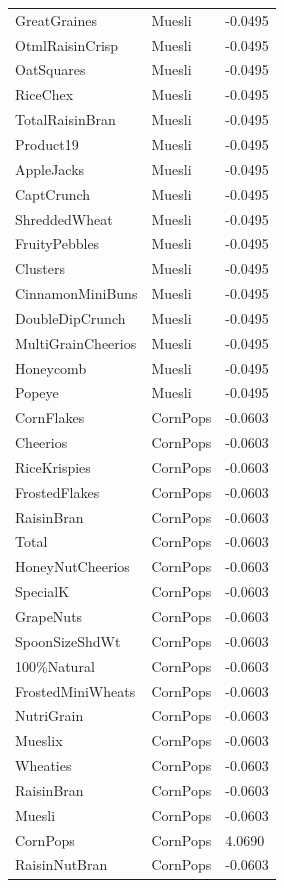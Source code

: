 \begin{table}[!htbp]
\begin{tabular}{lll}
GreatGraines & Muesli & -0.0495
\\
OtmlRaisinCrisp & Muesli & -0.0495
\\
OatSquares & Muesli & -0.0495
\\
RiceChex & Muesli & -0.0495
\\
TotalRaisinBran & Muesli & -0.0495
\\
Product19 & Muesli & -0.0495
\\
AppleJacks & Muesli & -0.0495
\\
CaptCrunch & Muesli & -0.0495
\\
ShreddedWheat & Muesli & -0.0495
\\
FruityPebbles & Muesli & -0.0495
\\
Clusters & Muesli & -0.0495
\\
CinnamonMiniBuns & Muesli & -0.0495
\\
DoubleDipCrunch & Muesli & -0.0495
\\
MultiGrainCheerios & Muesli & -0.0495
\\
Honeycomb & Muesli & -0.0495
\\
Popeye & Muesli & -0.0495
\\
CornFlakes & CornPops & -0.0603
\\
Cheerios & CornPops & -0.0603
\\
RiceKrispies & CornPops & -0.0603
\\
FrostedFlakes & CornPops & -0.0603
\\
RaisinBran & CornPops & -0.0603
\\
Total & CornPops & -0.0603
\\
HoneyNutCheerios & CornPops & -0.0603
\\
SpecialK & CornPops & -0.0603
\\
GrapeNuts & CornPops & -0.0603
\\
SpoonSizeShdWt & CornPops & -0.0603
\\
100\%Natural & CornPops & -0.0603
\\
FrostedMiniWheats & CornPops & -0.0603
\\
NutriGrain & CornPops & -0.0603
\\
Mueslix & CornPops & -0.0603
\\
Wheaties & CornPops & -0.0603
\\
RaisinBran & CornPops & -0.0603
\\
Muesli & CornPops & -0.0603
\\
CornPops & CornPops & 4.0690
\\
RaisinNutBran & CornPops & -0.0603
\\

\end{tabular}
\end{table}
